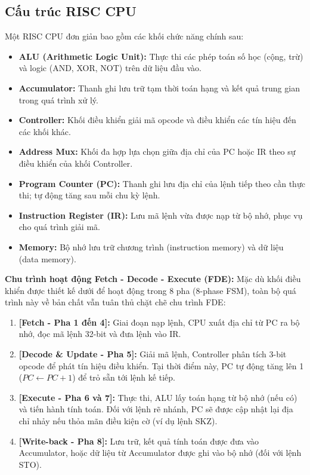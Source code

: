 \subsection{Cấu trúc RISC CPU}
Một RISC CPU đơn giản bao gồm các khối chức năng chính sau:
\begin{itemize}
    \item \textbf{ALU (Arithmetic Logic Unit):} Thực thi các phép toán số học (cộng, trừ) và logic (AND, XOR, NOT) trên dữ liệu đầu vào.
    \item \textbf{Accumulator:} Thanh ghi lưu trữ tạm thời toán hạng và kết quả trung gian trong quá trình xử lý.
    \item \textbf{Controller:} Khối điều khiển giải mã opcode và điều khiển các tín hiệu đến các khối khác.
    \item \textbf{Address Mux: } Khối đa hợp lựa chọn giữa địa chỉ của PC hoặc IR theo sự điều khiển của khối Controller.
    \item \textbf{Program Counter (PC):} Thanh ghi lưu địa chỉ của lệnh tiếp theo cần thực thi; tự động tăng sau mỗi chu kỳ lệnh.
    \item \textbf{Instruction Register (IR):} Lưu mã lệnh vừa được nạp từ bộ nhớ, phục vụ cho quá trình giải mã.
    \item \textbf{Memory:} Bộ nhớ lưu trữ chương trình (instruction memory) và dữ liệu (data memory).
\end{itemize}

\textbf{Chu trình hoạt động Fetch - Decode - Execute (FDE):}
Mặc dù khối điều khiển được thiết kế dưới để hoạt động trong 8 pha (8-phase FSM), 
toàn bộ quá trình này về bản chất vẫn tuân thủ chặt chẽ chu trình FDE:

\begin{center}
    \begin{minipage}{0.9\textwidth}
        \begin{enumerate}
            \item \textbf{[Fetch - Pha 1 đến 4]:} Giai đoạn nạp lệnh, CPU xuất địa chỉ từ PC ra bộ nhớ, 
            đọc mã lệnh 32-bit và đưa lệnh vào IR.
            \item \textbf{[Decode \& Update - Pha 5]:} Giải mã lệnh, Controller phân tích 3-bit opcode để phát tín hiệu điều khiển. 
            Tại thời điểm này, PC tự động tăng lên 1 ($PC \leftarrow PC + 1$) để trỏ sẵn tới lệnh kế tiếp.
            \item \textbf{[Execute - Pha 6 và 7]:} Thực thi, ALU lấy toán hạng từ bộ nhớ (nếu có) và tiến hành tính toán. 
            Đối với lệnh rẽ nhánh, PC sẽ được cập nhật lại địa chỉ nhảy nếu thỏa mãn điều kiện cờ (ví dụ lệnh SKZ).
            \item \textbf{[Write-back - Pha 8]:} Lưu trữ, kết quả tính toán được đưa vào Accumulator, 
            hoặc dữ liệu từ Accumulator được ghi vào bộ nhớ (đối với lệnh STO).
        \end{enumerate}
    \end{minipage}
\end{center}

